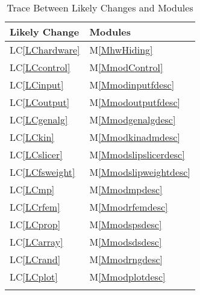 \documentclass[12pt]{article}
\begin{document}
\begin{longtable}{l l}
\toprule
Likely Change & Modules
\\
\midrule
LC\ref{LChardware} & M\ref{MhwHiding}
\\
LC\ref{LCcontrol} & M\ref{MmodControl}
\\
LC\ref{LCinput} & M\ref{Mmodinputfdesc}
\\
LC\ref{LCoutput} & M\ref{Mmodoutputfdesc}
\\
LC\ref{LCgenalg} & M\ref{Mmodgenalgdesc}
\\
LC\ref{LCkin} & M\ref{Mmodkinadmdesc}
\\
LC\ref{LCslicer} & M\ref{Mmodslipslicerdesc}
\\
LC\ref{LCfsweight} & M\ref{Mmodslipweightdesc}
\\
LC\ref{LCmp} & M\ref{Mmodmpdesc}
\\
LC\ref{LCrfem} & M\ref{Mmodrfemdesc}
\\
LC\ref{LCprop} & M\ref{Mmodspsdesc}
\\
LC\ref{LCarray} & M\ref{Mmodsdsdesc}
\\
LC\ref{LCrand} & M\ref{Mmodrngdesc}
\\
LC\ref{LCplot} & M\ref{Mmodplotdesc}
\\
\bottomrule
\caption{Trace Between Likely Changes and Modules}
\label{Table:TBLCaM}
\end{longtable}
\end{document}
